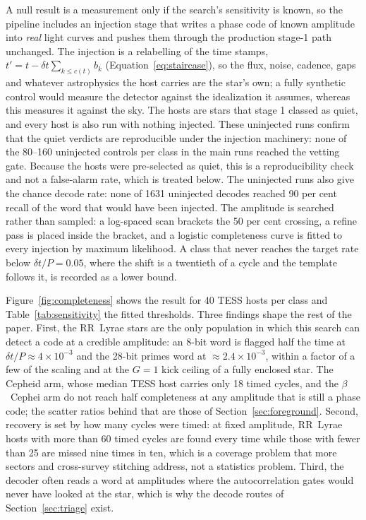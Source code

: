\documentclass[final,5p]{elsarticle}
\newcommand{\dtp}{\ensuremath{\delta t/P}}
\newcommand{\bcep}{\ensuremath{\beta}~Cephei}
\begin{document}
A null result is a measurement only if the search's sensitivity is known, so the pipeline includes an injection stage that writes a phase code of known amplitude into \emph{real} light curves and pushes them through the production stage-1 path unchanged. The injection is a relabelling of the time stamps, $t'=t-\delta t\sum_{k\le c(t)}b_k$ (Equation~\ref{eq:staircase}), so the flux, noise, cadence, gaps and whatever astrophysics the host carries are the star's own; a fully synthetic control would measure the detector against the idealization it assumes, whereas this measures it against the sky. The hosts are stars that stage 1 classed as quiet, and every host is also run with nothing injected. These uninjected runs confirm that the quiet verdicts are reproducible under the injection machinery: none of the 80--160 uninjected controls per class in the main runs reached the vetting gate. Because the hosts were pre-selected as quiet, this is a reproducibility check and not a false-alarm rate, which is treated below. The uninjected runs also give the chance decode rate: none of 1631 uninjected decodes reached 90 per cent recall of the word that would have been injected. The amplitude is searched rather than sampled: a log-spaced scan brackets the 50 per cent crossing, a refine pass is placed inside the bracket, and a logistic completeness curve is fitted to every injection by maximum likelihood. A class that never reaches the target rate below $\dtp=0.05$, where the shift is a twentieth of a cycle and the template follows it, is recorded as a lower bound.

Figure~\ref{fig:completeness} shows the result for 40 TESS hosts per class and Table~\ref{tab:sensitivity} the fitted thresholds. Three findings shape the rest of the paper. First, the RR~Lyrae stars are the only population in which this search can detect a code at a credible amplitude: an 8-bit word is flagged half the time at $\dtp\approx4\times10^{-3}$ and the 28-bit primes word at $\approx2.4\times10^{-3}$, within a factor of a few of the \citet{Learned2008} scaling and at the $G=1$ kick ceiling of a fully enclosed star. The Cepheid arm, whose median TESS host carries only 18 timed cycles, and the \bcep{} arm do not reach half completeness at any amplitude that is still a phase code; the scatter ratios behind that are those of Section~\ref{sec:foreground}. Second, recovery is set by how many cycles were timed: at fixed amplitude, RR~Lyrae hosts with more than 60 timed cycles are found every time while those with fewer than 25 are missed nine times in ten, which is a coverage problem that more sectors and cross-survey stitching address, not a statistics problem. Third, the decoder often reads a word at amplitudes where the autocorrelation gates would never have looked at the star, which is why the decode routes of Section~\ref{sec:triage} exist.
\end{document}
